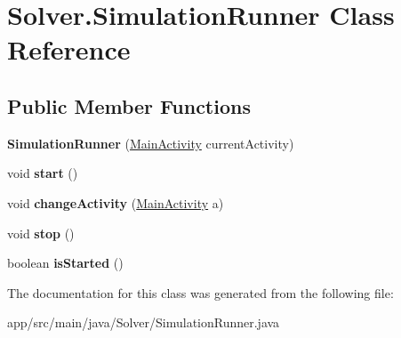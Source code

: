 \hypertarget{classSolver_1_1SimulationRunner}{}\section{Solver.\+Simulation\+Runner Class Reference}
\label{classSolver_1_1SimulationRunner}
\subsection*{Public Member Functions}
\begin{DoxyCompactItemize}
\item 
\mbox{\label{classSolver_1_1SimulationRunner_a58f6020d625c60b8a04329eced280ca9}} 
{\bfseries Simulation\+Runner} (\hyperlink{classwavesimulator_1_1MainActivity}{Main\+Activity} current\+Activity)
\item 
\mbox{\label{classSolver_1_1SimulationRunner_ab34c984e38253223884911c042175426}} 
void {\bfseries start} ()
\item 
\mbox{\label{classSolver_1_1SimulationRunner_ab44a9a2edd9aec16fe26bb05fa0f1115}} 
void {\bfseries change\+Activity} (\hyperlink{classwavesimulator_1_1MainActivity}{Main\+Activity} a)
\item 
\mbox{\label{classSolver_1_1SimulationRunner_a9b9b7707ac2d73e32cc86d3d0a609dde}} 
void {\bfseries stop} ()
\item 
\mbox{\label{classSolver_1_1SimulationRunner_a6b7b251488a9854ee2221e3fd37e4c26}} 
boolean {\bfseries is\+Started} ()
\end{DoxyCompactItemize}


The documentation for this class was generated from the following file\+:\begin{DoxyCompactItemize}
\item 
app/src/main/java/\+Solver/Simulation\+Runner.\+java\end{DoxyCompactItemize}
